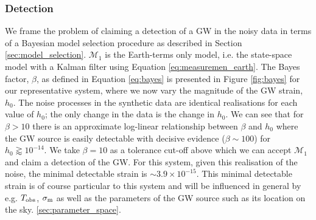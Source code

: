\documentclass[fleqn,usenatbib,useAMS]{mnras}
\begin{document}
\subsubsection{Detection} \label{sec:detection}
We frame the problem of claiming a detection of a GW in the noisy data in terms of a Bayesian model selection procedure as described in Section \ref{sec:model_selection}. $\mathcal{M}_1$ is the Earth-terms only model, i.e. the state-space model with a Kalman filter using Equation \eqref{eq:measuremen_earth}. The Bayes factor, $\beta$, as defined in Equation \eqref{eq:bayes} is presented in Figure \ref{fig:bayes} for our representative system, where we now vary the magnitude of the GW strain, $h_0$. The noise processes in the synthetic data are identical realisations for each value of $h_0$; the only change in the data is the change in $h_0$. We can see that for $\beta >10$ there is an approximate log-linear relationship between $\beta$ and $h_0$ where the GW source is easily detectable with decisive evidence ($\beta \sim 100$) for $h_0 \gtrapprox 10^{-14}$. We take $\beta = 10$ as a tolerance cut-off above which we can accept $\mathcal{M}_1$ and claim a detection of the GW. For this system, given this realisation of the noise, the minimal detectable strain is $\sim 3.9 \times 10^{-15}$. This minimal detectable strain is of course particular to this system and will be influenced in general by e.g. $T_{\rm obs}$, $\sigma_{\rm m}$ as well as the parameters of the GW source such as its location on the sky. \ref{sec:parameter_space}. \newline 
\end{document}
